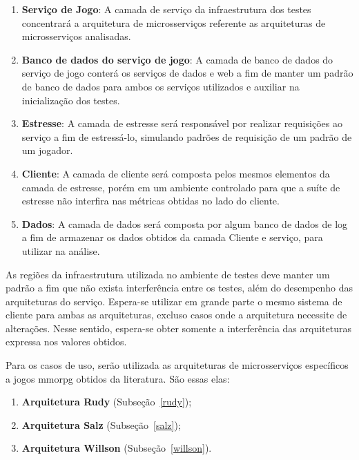 \begin{enumerate}
  \item \textbf{Serviço de Jogo}: A camada de serviço da infraestrutura dos testes concentrará a arquitetura de microsserviços referente as arquiteturas de microsserviços analisadas.
  \item \textbf{Banco de dados do serviço de jogo}: A camada de banco de dados do serviço de jogo conterá os serviços de dados e web a fim de manter um padrão de banco de dados para ambos os serviços utilizados e auxiliar na inicialização dos testes.
  \item \textbf{Estresse}: A camada de estresse será responsável por realizar requisições ao serviço a fim de estressá-lo, simulando padrões de requisição de um padrão de um jogador.
  \item \textbf{Cliente}: A camada de cliente será composta pelos mesmos elementos da camada de estresse, porém em um ambiente controlado para que a suíte de estresse não interfira nas métricas obtidas no lado do cliente.
  \item \textbf{Dados}: A camada de dados será composta por algum banco de dados de log a fim de armazenar os dados obtidos da camada Cliente e serviço, para utilizar na análise.
\end{enumerate}



As regiões da infraestrutura utilizada no ambiente de testes deve manter um padrão a fim que não exista interferência entre os testes, além do desempenho das arquiteturas do serviço.
%
Espera-se utilizar em grande parte o mesmo sistema de cliente para ambas as arquiteturas, excluso casos onde a arquitetura necessite de alterações.
%
Nesse sentido, espera-se obter somente a interferência das arquiteturas expressa nos valores obtidos.



Para os casos de uso, serão utilizada as arquiteturas de microsserviços específicos a jogos \ac{mmorpg} obtidos da literatura.
%
São essas elas:



\begin{enumerate}
  \item \textbf{Arquitetura Rudy} (Subseção~\ref{rudy});
  \item \textbf{Arquitetura Salz} (Subseção~\ref{salz});
  \item \textbf{Arquitetura Willson} (Subseção~\ref{willson}).
\end{enumerate}



